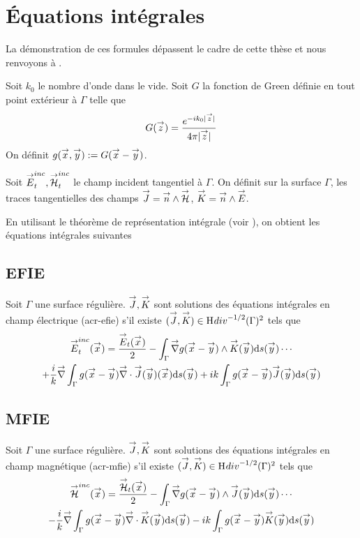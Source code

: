 \section{Équations intégrales}

    La démonstration de ces formules dépassent le cadre de cette thèse et nous renvoyons à \cite[\textsection~5.6]{nedelec_mixed_1980}.

    Soit \(k_0\) le nombre d'onde dans le vide. Soit \(G\) la fonction de Green définie en tout point extérieur à \(\Gamma\) telle que
    \begin{equation*}
      G(\vz) = \frac{e^{-ik_0|\vz|}}{4\pi|\vz|}
    \end{equation*}
    On définit \(g(\vx,\vy) := G(\vx - \vy)\).

    Soit \(\vE^{inc}_t,\vH^{inc}_t\) le champ incident tangentiel à \(\Gamma\). On définit sur la surface \(\Gamma\), les traces tangentielles des champs \(\vJ = \vn \pvect \vH\), \(\vK = \vn \pvect \vE\).

    En utilisant le théorème de représentation intégrale (voir \cite[Théorème 5.5.1]{nedelec_acoustic_2001}), on obtient les équations intégrales suivantes
    \subsection{EFIE}

      \begin{prop}
        \label{eq:form_int:EFIE}
        Soit \(\Gamma\) une surface régulière.
        \(\vJ,\vK\) sont solutions des équations intégrales en champ électrique (\gls{acr-efie}) s'il existe \((\vJ,\vK) \in \Hdiv^{-1/2}(\Gamma)^2\) tels que
        \begin{multline*}
          \vE^{inc}_t(\vx) =
            \frac{\vE_t(\vx)}{2}
              - \int_{\Gamma} \vgrad g(\vx - \vy) \pvect \vK(\vy) \dd{s}(\vy) \cdots \\
            + \frac{i}{k}\vgrad \int_{\Gamma}  g(\vx - \vy)\vdiv\vJ(\vy)(\vx) \dd{s}(\vy)
              +  ik\int_{\Gamma} g(\vx - \vy)\vJ(\vy) \dd{s}(\vy)
        \end{multline*}
      \end{prop}


    \subsection{MFIE}
      \begin{prop}
        \label{eq:form_int:MFIE}
        Soit \(\Gamma\) une surface régulière.
        \(\vJ,\vK\) sont solutions des équations intégrales en champ magnétique (\gls{acr-mfie}) s'il existe \((\vJ,\vK) \in \Hdiv^{-1/2}(\Gamma)^2\) tels que
        \begin{multline*}
          \vH^{inc}(\vx) =
          \frac{\vH_t(\vx)}{2}
            - \int_{\Gamma} \vgrad g(\vx - \vy) \pvect \vJ(\vy) \dd{s}(\vy) \cdots \\
          - \frac{i}{k} \vgrad \int_{\Gamma}  g(\vx - \vy)\vdiv\vK(\vy)\dd{s}(\vy)
            - ik \int_{\Gamma} g(\vx - \vy)\vK(\vy)\dd{s}(\vy)
        \end{multline*}
      \end{prop}

